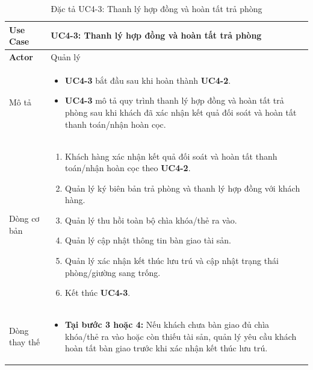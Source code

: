 \begin{table}[H]
    \centering
    \vspace{0.2cm}
\begin{tabularx}{\textwidth}{|>{\centering\arraybackslash\bfseries}m{3.5cm}|X|}
    \hline
    Use Case & {\centering\textbf{UC4-3: Thanh lý hợp đồng và hoàn tất trả phòng}\par} \\ 
    \hline
     
    Actor & Quản lý \\
    \hline

    Mô tả & 
    \vspace{0.2cm}
    \begin{itemize}[leftmargin=*, nosep, label=-]
        \item \textbf{UC4-3} bắt đầu sau khi hoàn thành \textbf{UC4-2}.
        \item \textbf{UC4-3} mô tả quy trình thanh lý hợp đồng và hoàn tất trả phòng sau khi khách đã xác nhận kết quả đối soát và hoàn tất thanh toán/nhận hoàn cọc.
    \end{itemize} \\ 
    \hline
     
    Dòng cơ bản & 
    \vspace{0.2cm}
    \begin{enumerate}[leftmargin=*, nosep]
        \item Khách hàng xác nhận kết quả đối soát và hoàn tất thanh toán/nhận hoàn cọc theo \textbf{UC4-2}.
        \item Quản lý ký biên bản trả phòng và thanh lý hợp đồng với khách hàng.
        \item Quản lý thu hồi toàn bộ chìa khóa/thẻ ra vào.
        \item Quản lý cập nhật thông tin bàn giao tài sản.
        \item Quản lý xác nhận kết thúc lưu trú và cập nhật trạng thái phòng/giường sang trống.
        \item Kết thúc \textbf{UC4-3}.
    \end{enumerate} \\ 
    \hline
     
    Dòng thay thế & 
    \vspace{0.2cm}
    \begin{itemize}[leftmargin=*, nosep, label=-]
        \item \textbf{Tại bước 3 hoặc 4:} Nếu khách chưa bàn giao đủ chìa khóa/thẻ ra vào hoặc còn thiếu tài sản, quản lý yêu cầu khách hoàn tất bàn giao trước khi xác nhận kết thúc lưu trú.
    \end{itemize} \\ 
    \hline
\end{tabularx}
\caption{Đặc tả UC4-3: Thanh lý hợp đồng và hoàn tất trả phòng}
\label{tab:uc4-3}
\end{table}





